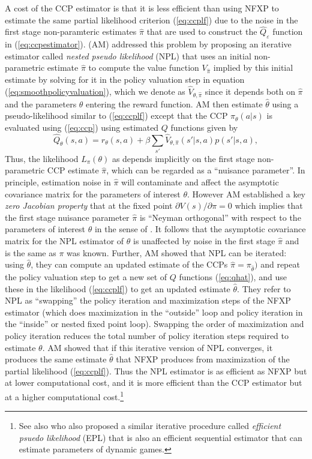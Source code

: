 A cost of the CCP estimator is that it is less efficient than using NFXP to estimate the same partial likelihood criterion (\ref{eq:ccplf})
due to the noise in the first stage non-paramteric estimates $\hat\pi$ that are used to construct
the $\hat Q_\varepsilon$ function in (\ref{eq:ccpestimator}).  \citet{AguirregabiriaMira:2002} (AM) addressed this problem
by proposing an iterative estimator called {\it nested pseudo likelihood\/} (NPL)  that uses an initial non-parametric estimate $\hat\pi$ 
to compute the value function $V_{\hat\pi}$ implied by this initial estimate by solving for it in the policy valuation step
in equation (\ref{eq:smoothpolicyvaluation}), which we denote as $\hat V_{\theta,\hat\pi}$ since it depends
both on $\hat\pi$ and the parameters $\theta$ entering
the reward function. AM then  estimate  $\hat\theta$ using a pseudo-likelihood similar to (\ref{eq:ccplf})
except that the CCP $\pi_\theta(a|s)$ is evaluated using (\ref{eq:ccp}) using estimated $Q$ functions given by
\begin{equation}
                  \hat Q_\theta(s,a)=r_\theta(s,a)+\beta \sum_{s'}\hat V_{\theta,\hat\pi}(s'|s,a)p(s'|s,a),
\label{eq:qhat}
\end{equation}
Thus, the likelihood $L_\pi(\theta)$ as depends implicitly on the first stage non-parametric CCP estimate $\hat\pi$, which can be regarded
as a ``nuisance parameter''. In principle, estimation noise in $\hat\pi$ will contaminate and affect the asymptotic 
covariance matrix for the parameters of interest $\theta$. However 
AM established a key {\it zero Jacobian property\/} that at the fixed point $\partial V(s)/\partial \pi=0$ 
which  implies that  the first stage nuisance parameter $\hat\pi$
is ``Neyman orthogonal'' with respect to the parameters of interest $\theta$ in the sense of \citet{lrspe:2022}. It follows 
that the asymptotic covariance matrix
for the NPL estimator of $\theta$ is unaffected by noise in the first stage $\hat\pi$ and is the same 
as $\pi$  was known. Further, 
AM showed that NPL can be iterated: using $\hat\theta$, they can compute an updated estimate of the CCPs 
$\hat\pi=\pi_{\hat\theta})$ and repeat the policy valuation step to get a new set of $Q$ functions (\ref{eq:qhat}), and use 
these in the likelihood (\ref{eq:ccplf}) to get an updated estimate $\hat\theta$. They refer to NPL as ``swapping''
the policy iteration and maximization steps of the NFXP estimator (which does maximization in the ``outside'' loop
and policy iteration in the ``inside'' or nested fixed point loop). Swapping the order of maximization
and policy iteration reduces the total number of policy iteration steps required to 
estimate $\theta$. AM showed that if this iterative version of  NPL converges, it produces the
same  estimate $\hat\theta$ that  NFXP produces from maximization of the partial likelihood  (\ref{eq:ccplf}).
Thus the NPL estimator is as efficient as NFXP but at lower computational cost, and it is more efficient than the CCP
estimator but at a higher computational cost.\footnote{\footnotesize
See also \citet{dearingblevins:2025} who also proposed a similar iterative
procedure called {\it efficient psuedo likelihood\/} (EPL) that is also an efficient sequential estimator that 
can estimate parameters of dynamic games.}  

